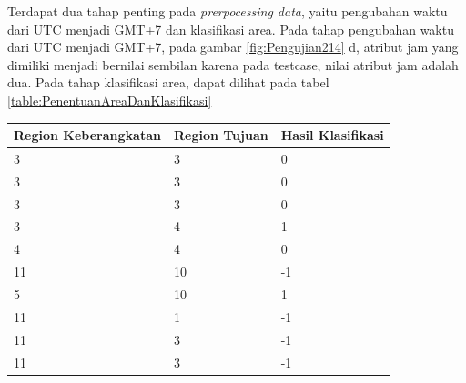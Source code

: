 \begin{enumerate}
	Terdapat dua tahap penting pada \textsl{prerpocessing data}, yaitu pengubahan waktu dari UTC menjadi GMT+7 dan klasifikasi area. Pada tahap pengubahan waktu dari UTC menjadi GMT+7, pada gambar \ref{fig:Pengujian214} d, atribut jam yang dimiliki menjadi bernilai sembilan karena pada testcase, nilai atribut jam adalah dua. Pada tahap klasifikasi area, dapat dilihat pada tabel \ref{table:PenentuanAreaDanKlasifikasi}
	
	\begin{table}[H]
	\centering
	\begin{tabular}{|l|l|l|}
	\hline
	\multicolumn{1}{|c|}{\textbf{Region Keberangkatan}} & \multicolumn{1}{c|}{\textbf{Region Tujuan}} & \multicolumn{1}{c|}{\textbf{Hasil Klasifikasi}} \\ \hline
	3                                                   & 3                                           & 0                                               \\ \hline
	3                                                   & 3                                           & 0                                               \\ \hline
	3                                                   & 3                                           & 0                                               \\ \hline
	3                                                   & 4                                           & 1                                               \\ \hline
	4                                                   & 4                                           & 0                                               \\ \hline
	11                                                  & 10                                          & -1                                              \\ \hline
	5                                                   & 10                                          & 1                                               \\ \hline
	11                                                  & 1                                           & -1                                              \\ \hline
	11                                                  & 3                                           & -1                                              \\ \hline
	11                                                  & 3                                           & -1                                              \\ \hline

\end{tabular}
\end{table}
\end{enumerate}
